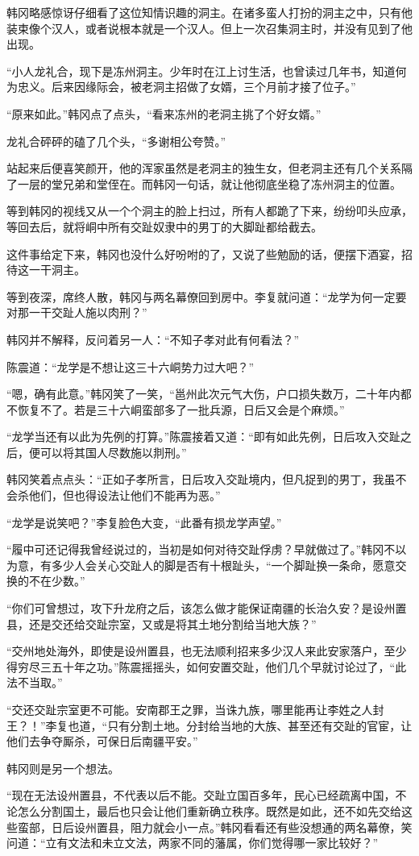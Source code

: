 韩冈略感惊讶仔细看了这位知情识趣的洞主。在诸多蛮人打扮的洞主之中，只有他装束像个汉人，或者说根本就是一个汉人。但上一次召集洞主时，并没有见到了他出现。

“小人龙礼合，现下是冻州洞主。少年时在江上讨生活，也曾读过几年书，知道何为忠义。后来因缘际会，被老洞主招做了女婿，三个月前才接了位子。”

“原来如此。”韩冈点了点头，“看来冻州的老洞主挑了个好女婿。”

龙礼合砰砰的磕了几个头，“多谢相公夸赞。”

站起来后便喜笑颜开，他的浑家虽然是老洞主的独生女，但老洞主还有几个关系隔了一层的堂兄弟和堂侄在。而韩冈一句话，就让他彻底坐稳了冻州洞主的位置。

等到韩冈的视线又从一个个洞主的脸上扫过，所有人都跪了下来，纷纷叩头应承，等回去后，就将峒中所有交趾奴隶中的男丁的大脚趾都给截去。

这件事给定下来，韩冈也没什么好吩咐的了，又说了些勉励的话，便摆下酒宴，招待这一干洞主。

等到夜深，席终人散，韩冈与两名幕僚回到房中。李复就问道：“龙学为何一定要对那一干交趾人施以肉刑？”

韩冈并不解释，反问着另一人：“不知子孝对此有何看法？”

陈震道：“龙学是不想让这三十六峒势力过大吧？”

“嗯，确有此意。”韩冈笑了一笑，“邕州此次元气大伤，户口损失数万，二十年内都不恢复不了。若是三十六峒蛮部多了一批兵源，日后又会是个麻烦。”

“龙学当还有以此为先例的打算。”陈震接着又道：“即有如此先例，日后攻入交趾之后，便可以将其国人尽数施以剕刑。”

韩冈笑着点点头：“正如子孝所言，日后攻入交趾境内，但凡捉到的男丁，我虽不会杀他们，但也得设法让他们不能再为恶。”

“龙学是说笑吧？”李复脸色大变，“此番有损龙学声望。”

“履中可还记得我曾经说过的，当初是如何对待交趾俘虏？早就做过了。”韩冈不以为意，有多少人会关心交趾人的脚是否有十根趾头，“一个脚趾换一条命，愿意交换的不在少数。”

“你们可曾想过，攻下升龙府之后，该怎么做才能保证南疆的长治久安？是设州置县，还是交还给交趾宗室，又或是将其土地分割给当地大族？”

“交州地处海外，即使是设州置县，也无法顺利招来多少汉人来此安家落户，至少得穷尽三五十年之功。”陈震摇摇头，如何安置交趾，他们几个早就讨论过了，“此法不当取。”

“交还交趾宗室更不可能。安南郡王之罪，当诛九族，哪里能再让李姓之人封王？！”李复也道，“只有分割土地。分封给当地的大族、甚至还有交趾的官宦，让他们去争夺厮杀，可保日后南疆平安。”

韩冈则是另一个想法。

“现在无法设州置县，不代表以后不能。交趾立国百多年，民心已经疏离中国，不论怎么分割国土，最后也只会让他们重新确立秩序。既然是如此，还不如先交给这些蛮部，日后设州置县，阻力就会小一点。”韩冈看看还有些没想通的两名幕僚，笑问道：“立有文法和未立文法，两家不同的藩属，你们觉得哪一家比较好？”


